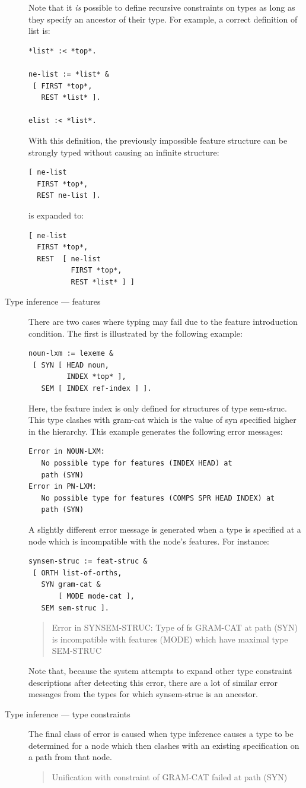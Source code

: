 \documentclass[12pt]{report}
\newenvironment{error}%
{\begin{quote}
\tt
}%
{\end{quote}
}
\begin{document}
\begin{description}
Note that it {\em is} 
possible to define recursive constraints on
types as long as they specify an ancestor of their type.
For example, a correct
definition of {\type list} is:
\begin{verbatim} 
*list* :< *top*.

ne-list := *list* &
 [ FIRST *top*,
   REST *list* ].

elist :< *list*.
\end{verbatim}
With this definition, the previously impossible feature structure 
can be strongly typed without causing an infinite structure:
\begin{verbatim}
[ ne-list 
  FIRST *top*,
  REST ne-list ].
\end{verbatim}
is expanded to:
\begin{verbatim}
[ ne-list 
  FIRST *top*,
  REST  [ ne-list
          FIRST *top*,
          REST *list* ] ]
\end{verbatim}
\item[Type inference --- features]
There are two cases where typing may fail due to
the feature introduction condition.  The first is illustrated
by the following example:
\begin{verbatim}
noun-lxm := lexeme &
 [ SYN [ HEAD noun,
         INDEX *top* ],
   SEM [ INDEX ref-index ] ].
\end{verbatim}
Here, the feature {\feature index} is only defined for structures of type
{\type sem-struc}.  This type clashes with {\type gram-cat} which is
the value of {\feature syn} specified
higher in the hierarchy.
This example generates the following error messages:
\begin{verbatim}
Error in NOUN-LXM:
   No possible type for features (INDEX HEAD) at 
   path (SYN)
Error in PN-LXM:
   No possible type for features (COMPS SPR HEAD INDEX) at 
   path (SYN)
\end{verbatim}

A slightly different error message
is generated when a type is specified at a node which is incompatible
with the node's features.  For instance:
\begin{verbatim}
synsem-struc := feat-struc &
 [ ORTH list-of-orths,
   SYN gram-cat & 
       [ MODE mode-cat ],
   SEM sem-struc ].
\end{verbatim}
\begin{error}
Error in SYNSEM-STRUC:
  Type of fs GRAM-CAT at path (SYN) is incompatible with features (MODE) which have maximal type SEM-STRUC
\end{error}
Note that, because the system attempts to expand other
type constraint descriptions after detecting this error,
there are a lot of similar error messages from the types for which
{\type synsem-struc} is an ancestor.

\item[Type inference --- type constraints]
The final class of error is caused when type inference causes a
type to be determined for a node which then clashes with an existing
specification on a path from that node.  
\begin{error}
Unification with constraint of GRAM-CAT failed at path (SYN)
\end{error}
\end{description}
\end{document}
